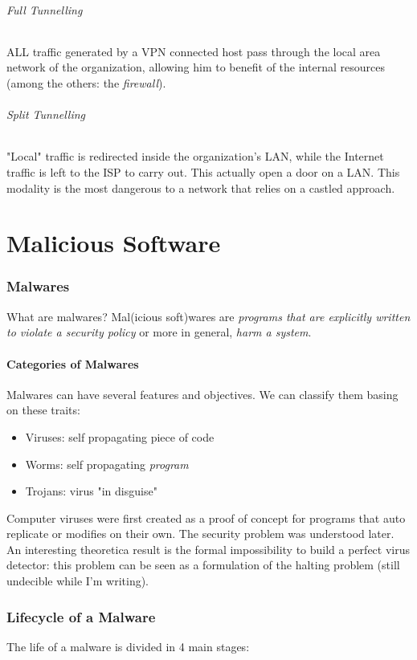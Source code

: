 \documentclass{article}
\begin{document}
				\paragraph{Full Tunnelling}
					ALL traffic generated by a VPN connected host pass through the local area network of the organization, allowing him to benefit of the internal resources (among the others: the \emph{firewall}).
				
				\paragraph{Split Tunnelling}
					"Local" traffic is redirected inside the organization's LAN, while the Internet traffic is left to the ISP to carry out. This actually open a door on a LAN. This modality is the most dangerous to a network that relies on a castled approach. 
	
	\clearpage \part{Malicious Software}
		\section{Malwares}
			What are malwares? Mal(icious soft)wares are \emph{programs that are explicitly written to violate a security policy} or more in general, \emph{harm a system}.
			
			\subsection{Categories of Malwares}
				Malwares can have several features and objectives. We can classify them basing on these traits:
				\begin{itemize}
					\item Viruses: self propagating piece of code
					\item Worms: self propagating \emph{program}
					\item Trojans: virus "in disguise"
				\end{itemize}
				Computer viruses were first created as a proof of concept for programs that auto replicate or modifies on their own. The security problem was understood later. An interesting theoretica result is the formal impossibility to build a perfect virus detector: this problem can be seen as a formulation of the halting problem (still undecible while I'm writing). 
				
		\section{Lifecycle of a Malware}
			The life of a malware is divided in 4 main stages:
			
\end{document}
